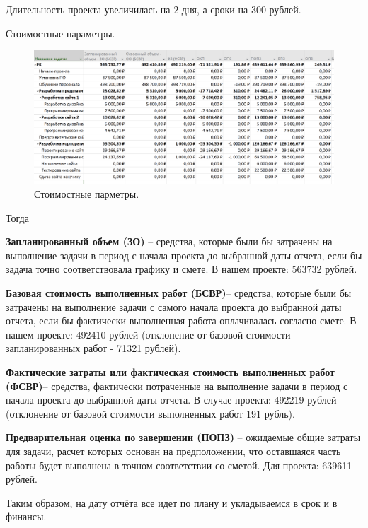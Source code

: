 \documentclass[a4paper,14pt]{extreport} %
\begin{document}
\begin{enumerate}
Длительность проекта увеличилась на 2 дня, а сроки на 300 рублей.

Стоимостные параметры.

\begin{figure}[H]
  \centering
  \caption{Стоимостные парметры. }
  \includegraphics[scale=0.5]{27}
\end{figure}

Тогда

\textbf{Запланированный объем (ЗО)} -- средства, которые были бы затрачены на выполнение задачи в период с начала проекта до выбранной даты отчета, если бы задача точно соответствовала графику и смете. В нашем проекте: 563732 рублей.

\textbf{Базовая стоимость выполненных работ (БСВР)}-- средства, которые были бы затрачены на выполнение задачи с самого начала проекта до выбранной даты отчета, если бы фактически выполненная работа оплачивалась согласно смете. В нашем проекте: 492410 рублей (отклонение от базовой стоимости запланированных работ - 71321 рублей).

\textbf{Фактические затраты или фактическая стоимость выполненных работ (ФСВР)}-- средства, фактически потраченные на выполнение задачи в период с начала проекта до выбранной даты отчета. В случае проекта: 492219 рублей (отклонение от базовой стоимости выполненных работ 191 рубль). 

\textbf{Предварительная оценка по завершении (ПОПЗ)} -- ожидаемые общие затраты для задачи, расчет которых основан на предположении, что оставшаяся часть работы будет выполнена в точном соответствии со сметой. Для проекта: 639611 рублей.

Таким образом, на дату отчёта все идет по плану и укладываемся в срок и в финансы.

\end{enumerate}
\end{document}
